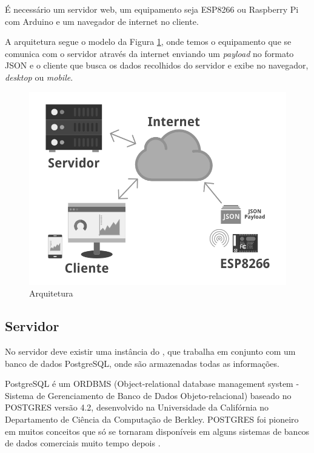 É necessário um servidor web, um equipamento \iot seja ESP8266 ou
Raspberry Pi com Arduino e um navegador de internet no cliente.

A arquitetura segue o modelo da Figura \ref{fig:arquitetura}, onde temos
o equipamento \iot que se comunica com o servidor através da internet
enviando um \emph{payload} no formato JSON e o cliente que busca os
dados recolhidos do servidor e exibe no navegador, \emph{desktop} ou
\emph{mobile}.

\begin{figure}[h]
    \centering
    \includegraphics[scale=0.4]{img/arquitetura-grey.png}
    \caption{Arquitetura} \label{fig:arquitetura}
\end{figure}

\subsection{Servidor}\label{servidor}

No servidor deve existir uma instância do \wm, que trabalha em conjunto
com um banco de dados PostgreSQL, onde são armazenadas todas as
informações.

PostgreSQL é um ORDBMS (Object-relational database management system -
Sistema de Gerenciamento de Banco de Dados Objeto-relacional) baseado no
POSTGRES versão 4.2, desenvolvido na Universidade da Califórnia no
Departamento de Ciência da Computação de Berkley. POSTGRES foi pioneiro
em muitos conceitos que só se tornaram disponíveis em alguns sistemas de
bancos de dados comerciais muito tempo depois \cite{postgresql:2016}.

